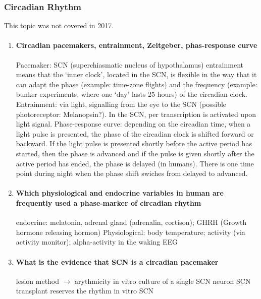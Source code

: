 \documentclass[12pt,article,oneside,a4paper]{memoir}
\begin{document}
\subsubsection{Circadian Rhythm}
This topic was not covered in 2017.
\begin{enumerate}
\item \paragraph{Circadian pacemakers, entrainment, Zeitgeber, phas-response
curve}

Pacemaker: SCN (superchiasmatic nucleus of hypothalamus)
entrainment means that the ‘inner clock’, located in the SCN, is flexible in
the way that it can adapt the phase (example: time-zone flights) and the
frequency (example: bunker experiments, where one ‘day’ lasts 25 hours) of the
circadian clock.
Entrainment: via light, signalling from the eye to the SCN (possible
photoreceptor: Melanopsin?). In the SCN, per transcription is activated upon
light signal.
Phase-response curve: depending on the circadian time, when a light pulse is
presented, the phase of the circadian clock is shifted forward or backward. If
the light pulse is presented shortly before the active period has started, then
the phase is advanced and if the pulse is given shortly after the active period
has ended, the phase is delayed (in humans). There is one time point during
night when the phase shift swiches from delayed to advanced.

\item \paragraph{Which physiological and endocrine variables in human are
frequently used a phase-marker of circadian rhythm}

endocrine: melatonin, adrenal gland (adrenalin, cortison); GHRH (Growth
hormone releasing hormon)
Physiological: body temperature; activity (via activity monitor);
alpha-activity in the waking EEG

\item \paragraph{What is the evidence that SCN is a circadian pacemaker}

lesion method $\rightarrow$ arythmicity
in vitro culture of a single SCN neuron    
SCN transplant reserves the rhythm
in vitro SCN


\end{enumerate}
\end{document}

